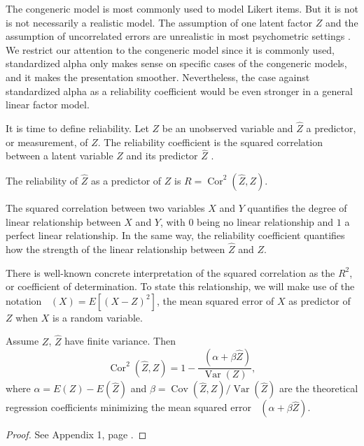 \documentclass[twoside]{article}
\DeclareMathOperator{\Var}{Var}
\DeclareMathOperator{\Cor}{Cor}
\DeclareMathOperator{\Cov}{Cov}
\DeclareMathOperator{\MSE}{MSE_Z}
\begin{document}
The congeneric model is most commonly used to model Likert items. But it is not is not necessarily a realistic model. The assumption of one latent factor $Z$ and the assumption of uncorrelated errors are unrealistic in most psychometric settings \citep[][Section 1.2 -- 1.3]{Green2009-le}. We restrict our attention to the congeneric model since it is commonly used, standardized alpha only makes sense on specific cases of the congeneric models, and it makes the presentation smoother. Nevertheless, the case against standardized alpha as a reliability coefficient would be even stronger in a general linear factor model. 

It is time to define reliability. Let $Z$ be an unobserved variable and $\hat{Z}$ a predictor, or measurement, of $Z$. The reliability coefficient is the squared correlation between a latent variable $Z$ and its predictor $\hat{Z}$ \citep[][p. 61]{Lord1968-ax}. 

\begin{defn}\label{defn:reliability} The reliability of $\hat{Z}$ as a predictor of $Z$ is $ R=\Cor^{2}(\hat{Z},Z)$.
\end{defn} 

The squared correlation between two variables $X$ and $Y$ quantifies the degree of linear relationship between $X$ and $Y$, with $0$ being no linear relationship and $1$ a perfect linear relationship. In the same way, the reliability coefficient quantifies how the strength of the linear relationship between $\hat{Z}$ and $Z$.

There is well-known concrete interpretation of the squared correlation as the $R^2$, or coefficient of determination. To state this relationship, we will make use of the notation $\MSE(X) = E[(X-Z)^2]$, the mean squared error of $X$ as predictor of $Z$ when $X$ is a random variable.

\begin{lem}
\label{lem:r^2 and correlation}Assume $Z$, $\hat{Z}$ have finite
variance. Then 
\begin{equation}
\Cor^{2}(\hat{Z},Z)=1-\frac{\MSE(\alpha+\beta\hat{Z})}{\Var(Z)},\label{eq:rsq and correlation}
\end{equation}
where $\alpha=E(Z)-E(\hat{Z})$ and $\beta=\Cov(\hat{Z},Z)/\Var(\hat{Z})$ are the theoretical regression coefficients minimizing the mean squared error $\MSE(\alpha+\beta\hat{Z})$. 
\end{lem}
\begin{proof}
See Appendix 1, page \pageref{proof:r^2 and correlation}.
\end{proof}
\end{document}
